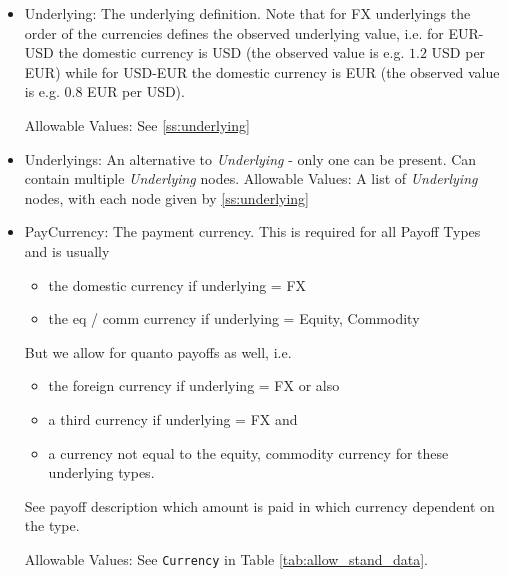 \begin{itemize}
\item Underlying: The underlying definition. Note that for FX underlyings the order of the currencies defines the
  observed underlying value, i.e. for EUR-USD the domestic currency is USD (the observed value is e.g. $1.2$ USD per
  EUR) while for USD-EUR the domestic currency is EUR (the observed value is e.g. $0.8$ EUR per USD).

  Allowable Values: See \ref{ss:underlying}
  
\item Underlyings: An alternative to \emph{Underlying} - only one can be present. Can contain multiple \emph{Underlying} nodes.
  Allowable Values: A list of \emph{Underlying} nodes, with each node given by \ref{ss:underlying}

\item PayCurrency: The payment currency. This is required for all Payoff Types and is usually

  \begin{itemize}
  \item the domestic currency if underlying = FX
  \item the eq / comm currency if underlying = Equity, Commodity
  \end{itemize}

  But we allow for quanto payoffs as well, i.e.

  \begin{itemize}
  \item the foreign currency if underlying = FX or also
  \item a third currency if underlying = FX and
  \item  a currency not equal to the equity, commodity currency for these underlying types.
  \end{itemize}

  See payoff description which amount is paid in which currency dependent on the type.

  Allowable Values: See \lstinline!Currency!  in Table \ref{tab:allow_stand_data}.


\end{itemize}
